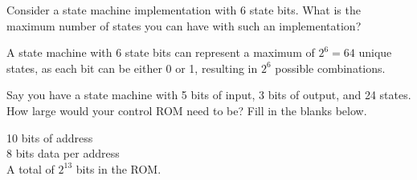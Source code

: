 \documentclass[12pt, letterpaper]{article}
\begin{document}
\begin{subproblem}{}
    Consider a state machine implementation with 6 state bits. 
    What is the maximum number of states you can have with such an implementation?
\end{subproblem}
A state machine with 6 state bits can represent a maximum of \(2^6 = 64\) unique states, as each bit can be either 0 or 1, resulting in \(2^6\) possible combinations.

\begin{subproblem}{}
    Say you have a state machine with 5 bits of input, 3 bits of output, and 24 states. How large would your control ROM need to be? Fill in the blanks below.
\end{subproblem}
\begin{center}
    \large 10 bits of address\\
    8 bits data per address\\
    A total of $2^{13}$ bits in the ROM.
\end{center}
\end{document}
